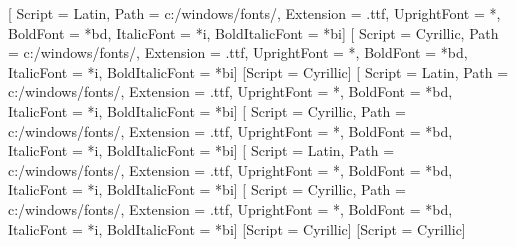 \ifxetexorluatex
    \setmainlanguage[babelshorthands=true]{russian}  %
    \ifwindows
        \setmonofont{cour}[                     %
            Script = Latin,
            Path = c:/windows/fonts/,
            Extension = .ttf,
            UprightFont = *,
            BoldFont = *bd,
            ItalicFont = *i,
            BoldItalicFont = *bi]
        \newfontfamily{}[    %
            Script = Cyrillic,
            Path = c:/windows/fonts/,
            Extension = .ttf,
            UprightFont = *,
            BoldFont = *bd,
            ItalicFont = *i,
            BoldItalicFont = *bi]
    \else
        \setmonofont{Courier New}
        \newfontfamily{}[Script = Cyrillic]
    \fi
    \ifXeTeX
    \else
    \fi
    \ifwindows
        \setmainfont{times}[                    %
            Script = Latin,
            Path = c:/windows/fonts/,
            Extension = .ttf,
            UprightFont = *,
            BoldFont = *bd,
            ItalicFont = *i,
            BoldItalicFont = *bi]
        \newfontfamily{}[     %
            Script = Cyrillic,
            Path = c:/windows/fonts/,
            Extension = .ttf,
            UprightFont = *,
            BoldFont = *bd,
            ItalicFont = *i,
            BoldItalicFont = *bi]
        \setsansfont{arial}[                    %
            Script = Latin,
            Path = c:/windows/fonts/,
            Extension = .ttf,
            UprightFont = *,
            BoldFont = *bd,
            ItalicFont = *i,
            BoldItalicFont = *bi]
        \newfontfamily{}[   %
            Script = Cyrillic,
            Path = c:/windows/fonts/,
            Extension = .ttf,
            UprightFont = *,
            BoldFont = *bd,
            ItalicFont = *i,
            BoldItalicFont = *bi]
    \else
        \setmainfont{Times New Roman}
        \newfontfamily{}[Script = Cyrillic]
        \setsansfont{Arial}
        \newfontfamily{}[Script = Cyrillic]
    \fi
\else
\fi

\captionsetup{%
singlelinecheck=off,                %
skip=2pt,                           %
justification=centering,            %
}

